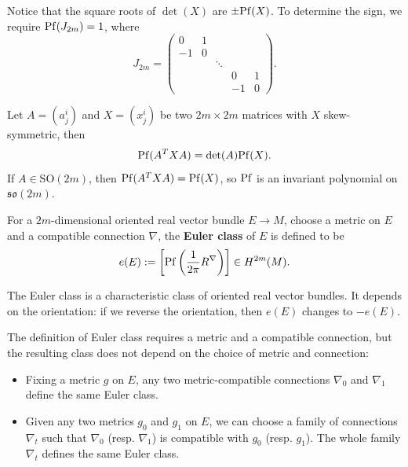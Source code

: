 \begin{remark}
    Notice that the square roots of $\det(X)$ are $\pm{\rm Pf}(X)$. 
    To determine the sign, we require ${\rm Pf}(J_{2m}) = 1$, where 
    \begin{equation*}
        J_{2m} = 
        \begin{pmatrix}
            0 & 1 &  &  & \\
            -1 & 0 &  &  & \\
             &  & \ddots &  & \\
             &  &  &  0 & 1 \\
             & &  & -1 & 0
        \end{pmatrix}.
    \end{equation*}
\end{remark}
\begin{fact}
    Let $A=(a^i_j)$ and $X=(x^i_j)$ be two $2m\times 2m$ matrices with $X$ skew-symmetric, then 
    \begin{equation*}
        {\rm Pf}(A^T X A) = \det(A){\rm Pf}(X).
    \end{equation*}
    If $A\in\mathrm{SO}(2m)$, then ${\rm Pf}(A^T X A) = {\rm Pf}(X)$, 
    so ${\rm Pf}$ is an invariant polynomial on $\mathfrak{so}(2m)$.
\end{fact}
\begin{definition}
    For a $2m$-dimensional oriented real vector bundle $E\to M$, 
    choose a metric on $E$ and a compatible connection $\nabla$, 
    the \textbf{Euler class} of $E$ is defined to be
    \begin{equation*}
        e(E) := \left[{\rm Pf}\left(\frac{1}{2\pi}R^\nabla\right)\right] \in H^{2m}(M).
    \end{equation*} 
\end{definition}
\begin{remark}
    The Euler class is a characteristic class of oriented real vector bundles. 
    It depends on the orientation: 
    if we reverse the orientation, then $e(E)$ changes to $-e(E)$.
\end{remark}
\begin{remark}
    The definition of Euler class requires a metric and a compatible connection, 
    but the resulting class does not depend on the choice of metric and connection:
    \begin{itemize}[leftmargin=*]
        \item Fixing a metric $g$ on $E$, any two metric-compatible connections 
        $\nabla_0$ and $\nabla_1$ define the same Euler class. 
        \item Given any two metrics $g_0$ and $g_1$ on $E$, 
        we can choose a family of connections $\nabla_t$ such that 
        $\nabla_0$ (resp. $\nabla_1$) is compatible with $g_0$ (resp. $g_1$). 
        The whole family $\nabla_t$ defines the same Euler class.
    \end{itemize} 
\end{remark}
